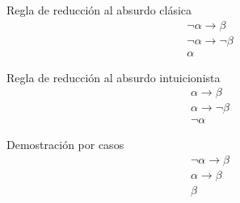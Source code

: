 \begin{ejercicio*}
\begin{enumerate}
\end{enumerate}

\end{ejercicio*}

\begin{ejemplo}
    Regla de reducción al absurdo clásica
    \begin{equation*}
        \begin{array}{c}
            \lnot\alpha\rightarrow\beta \\
            \lnot\alpha\rightarrow\lnot\beta \\
            \hline
            \alpha
        \end{array}
    \end{equation*}
\end{ejemplo}

\begin{ejemplo}
    Regla de reducción al absurdo intuicionista
    \begin{equation*}
        \begin{array}{c}
            \alpha\rightarrow\beta\\
            \alpha\rightarrow\lnot\beta \\
            \hline
            \lnot\alpha
        \end{array}
    \end{equation*}
\end{ejemplo}

\begin{ejemplo}
    Demostración por casos
    \begin{equation*}
        \begin{array}{c}
            \lnot\alpha\rightarrow\beta\\
            \alpha\rightarrow\beta\\
            \hline
            \beta
        \end{array}
    \end{equation*}
\end{ejemplo}

